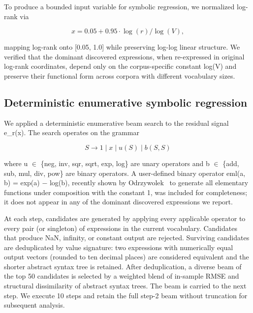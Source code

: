 \documentclass[11pt]{article}
\begin{document}
To produce a bounded input variable for symbolic regression, we normalized log-rank via

\begin{equation}
\tag{4}\label{eq:xnorm}
x = 0.05 + 0.95 \cdot \log(r) / \log(V),
\end{equation}

mapping log-rank onto [0.05, 1.0] while preserving log-log linear structure. We verified that the dominant discovered expressions, when re-expressed in original log-rank coordinates, depend only on the corpus-specific constant log(V) and preserve their functional form across corpora with different vocabulary sizes.

\subsection{Deterministic enumerative symbolic regression}\label{sec:srmethod}

We applied a deterministic enumerative beam search to the residual signal e\_r(x). The search operates on the grammar

\begin{equation}
\tag{5}\label{eq:grammar}
S \to 1 \mid x \mid u(S) \mid b(S,S)
\end{equation}

where u $\in$ \{neg, inv, sqr, sqrt, exp, log\} are unary operators and b $\in$ \{add, sub, mul, div, pow\} are binary operators. A user-defined binary operator eml(a, b) = exp(a) − log(b), recently shown by Odrzywolek~\cite{odrzywolek2026} to generate all elementary functions under composition with the constant 1, was included for completeness; it does not appear in any of the dominant discovered expressions we report.

At each step, candidates are generated by applying every applicable operator to every pair (or singleton) of expressions in the current vocabulary. Candidates that produce NaN, infinity, or constant output are rejected. Surviving candidates are deduplicated by value signature: two expressions with numerically equal output vectors (rounded to ten decimal places) are considered equivalent and the shorter abstract syntax tree is retained. After deduplication, a diverse beam of the top 50 candidates is selected by a weighted blend of in-sample RMSE and structural dissimilarity of abstract syntax trees. The beam is carried to the next step. We execute 10 steps and retain the full step-2 beam without truncation for subsequent analysis.
\end{document}
